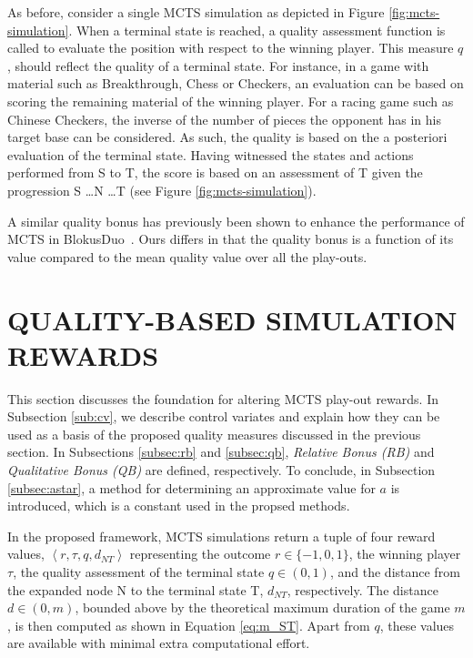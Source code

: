 \documentclass{ecai2014}
\newcommand{\tuple}[1]{\ensuremath{\left \langle #1 \right \rangle }}
\newcommand{\node}[1]{{\fontfamily{phv}\selectfont#1}}
\begin{document}
As before, consider a single MCTS simulation as depicted in Figure \ref{fig:mcts-simulation}. When a terminal state is reached, a quality assessment function is called to evaluate the position with respect to the winning player. This measure $q$, should reflect the quality of a terminal state. For instance, in a game with material such as Breakthrough, Chess or Checkers, an evaluation can be based on scoring the remaining material of the winning player. For a racing game such as Chinese Checkers, the inverse of the number of pieces the opponent has in his target base can be considered. As such, the quality is based on the a posteriori evaluation of the terminal state. Having witnessed the states and actions performed from \node{S} to \node{T}, the score is based on an assessment of \node{T} given the progression \node{S} \ldots \node{N} \ldots \node{T} (see Figure \ref{fig:mcts-simulation}).

A similar quality bonus has previously been shown to enhance the performance of MCTS in BlokusDuo~\cite{shibahara2008combining}. Ours differs in that the quality bonus
is a function of its value compared to the mean quality value over all the play-outs.  

\section{QUALITY-BASED SIMULATION REWARDS}
\label{sec:qoreward}
This section discusses the foundation for altering MCTS play-out rewards. In Subsection \ref{sub:cv}, we describe control variates and explain how they can be used as a basis of the proposed quality measures discussed in the previous section. In Subsections \ref{subsec:rb} and \ref{subsec:qb}, \emph{Relative Bonus (RB)} and \emph{Qualitative Bonus (QB)} are defined, respectively. To conclude, in Subsection \ref{subsec:astar}, a method for determining an approximate value for $a$ is introduced, which is a constant used in the propsed methods.

In the proposed framework, MCTS simulations return a tuple of four reward values, $\tuple{r,\tau,q,d_{NT}}$ representing the outcome $r\in\{-1, 0, 1\}$, the winning player $\tau$, the quality assessment of the terminal state $q\in(0, 1)$, and the distance from the expanded node \node{N} to the terminal state \node{T}, $d_{NT}$, respectively. The distance $d\in(0, m)$, bounded above by the theoretical maximum duration of the game $m$, is then computed as shown in Equation \ref{eq:m_ST}. Apart from $q$, these values are available with minimal extra computational effort.
\end{document}
